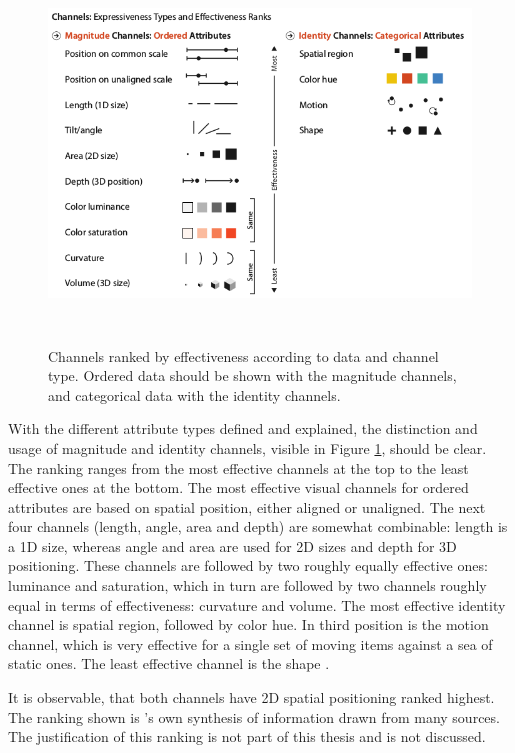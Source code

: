 \begin{figure}[!htb]
\centering
\includegraphics[height=10cm,keepaspectratio]{images/va/channels-ranked.png}
\caption[
    Channels ranked by effectiveness according to data and channel type. Ordered data should be shown with the magnitude channels, and categorical data with the identity channels .
]{Channels ranked by effectiveness according to data and channel type. Ordered data should be shown with the magnitude channels, and categorical data with the identity channels.}
\label{fig:va-channels-ranked}
\end{figure}

With the different attribute types defined and explained, the distinction and usage of magnitude and identity channels, visible in Figure \ref{fig:va-channels-ranked}, should be clear. The ranking ranges from the most effective channels at the top to the least effective ones at the bottom. The most effective visual channels for ordered attributes are based on spatial position, either aligned or unaligned. The next four channels (length, angle, area and depth) are somewhat combinable: length is a 1D size, whereas angle and area are used for 2D sizes and depth for 3D positioning. These channels are followed by two roughly equally effective ones: luminance and saturation, which in turn are followed by two channels roughly equal in terms of effectiveness: curvature and volume. The most effective identity channel is spatial region, followed by color hue. In third position is the motion channel, which is very effective for a single set of moving items against a sea of static ones. The least effective channel is the shape .

It is observable, that both channels have 2D spatial positioning ranked highest. The ranking shown is \citeauthor{Munzner2014}'s own synthesis of information drawn from many sources. The justification of this ranking is not part of this thesis and is not discussed.